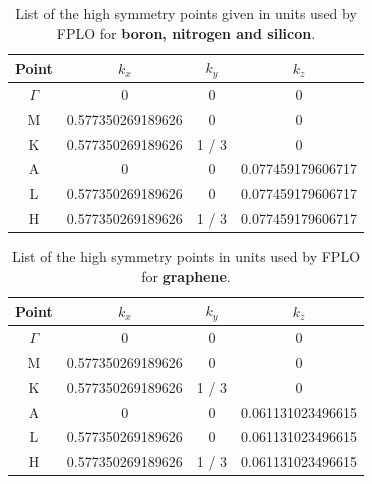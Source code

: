 			\begin{table}[h]
				\centering
				\begin{tabular}{cccc}
					\midrule
					Point & $k_x$ & $k_y$ & $k_z$ \\
					\midrule
					$\Gamma$ & 0 & 0 & 0 \\
					M & 0.577350269189626 & 0 & 0 \\
					K & 0.577350269189626 & 1 / 3 & 0 \\
					A & 0 & 0 & 0.077459179606717 \\
					L & 0.577350269189626 & 0 & 0.077459179606717 \\
					H & 0.577350269189626 & 1 / 3 & 0.077459179606717 \\
					\bottomrule
				\end{tabular}
				\caption{List of the high symmetry points given in units used by FPLO for \textbf{boron, nitrogen and silicon}.}
				\label{table:highsymmetryPointsGraphene}
			\end{table}
			\begin{table}[h]
				\centering
				\begin{tabular}{cccc}
					\midrule
					Point & $k_x$ & $k_y$ & $k_z$ \\
					\midrule
					$\Gamma$ & 0 & 0 & 0 \\
					M & 0.577350269189626 & 0 & 0 \\
					K & 0.577350269189626 & 1 / 3 & 0 \\
					A & 0 & 0 & 0.061131023496615 \\
					L & 0.577350269189626 & 0 & 0.061131023496615 \\
					H & 0.577350269189626 & 1 / 3 & 0.061131023496615 \\
					\bottomrule
				\end{tabular}
				\caption{List of the high symmetry points in units used by FPLO for \textbf{graphene}.}
				\label{table:highsymmetryPointsGraphene}
			\end{table}
		
